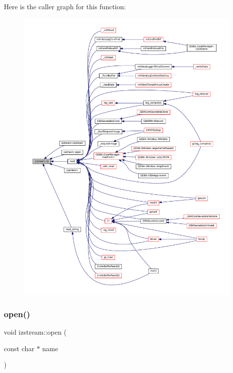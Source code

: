 Here is the caller graph for this function\+:
\nopagebreak
\begin{figure}[H]
\begin{center}
\leavevmode
\includegraphics[width=350pt]{classizstream_a0438da66cc9cdb1a2a7ab4872a909fbf_icgraph}
\end{center}
\end{figure}
\mbox{\label{classizstream_a3e0af69bbc4704daa637850817b77098}} 
\subsubsection{\texorpdfstring{open()}{open()}\hspace{0.1cm}{\footnotesize\ttfamily [1/2]}}
{\footnotesize\ttfamily void izstream\+::open (\begin{DoxyParamCaption}\item[{const char $\ast$}]{name }\end{DoxyParamCaption})\hspace{0.3cm}{\ttfamily [inline]}}

